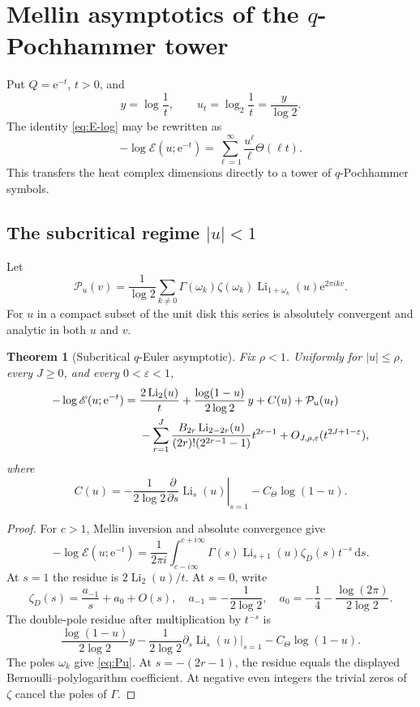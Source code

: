 \documentclass[11pt,oneside]{article}
\numberwithin{equation}{section}
\theoremstyle{plain}
\newtheorem{theorem}{Theorem}[section]
\theoremstyle{definition}
\theoremstyle{remark}
\newcommand{\Li}{\operatorname{Li}}
\newcommand{\dd}{\,\mathrm{d}}
\newcommand{\Ecal}{\mathscr E}
\newcommand{\Pcal}{\mathcal P}
\newcommand{\e}{\mathrm e}
\begin{document}
\section{Mellin asymptotics of the $q$-Pochhammer tower}

Put $Q=\e^{-t}$, $t>0$, and
\[
 y=\log\frac1t,
 \qquad
 u_t=\log_2\frac1t=\frac y{\log2}.
\]
The identity \cref{eq:E-log} may be rewritten as
\begin{equation}\label{eq:E-Theta}
 -\log\Ecal(u;\e^{-t})
 =\sum_{\ell=1}^{\infty}\frac{u^\ell}{\ell}\Theta(\ell t).
\end{equation}
This transfers the heat complex dimensions directly to a tower of $q$-Pochhammer symbols.

\subsection{The subcritical regime $|u|<1$}

Let
\begin{equation}\label{eq:Pu}
 \Pcal_u(v)=\frac1{\log2}
 \sum_{k\ne0}\Gamma(\omega_k)\zeta(\omega_k)
 \Li_{1+\omega_k}(u)\e^{2\pi ikv}.
\end{equation}
For $u$ in a compact subset of the unit disk this series is absolutely convergent and analytic in both $u$ and $v$.

\begin{theorem}[Subcritical $q$-Euler asymptotic]\label{thm:E-subcritical}
Fix $\rho<1$.  Uniformly for $|u|\le\rho$, every $J\ge0$, and every $0<\varepsilon<1$,
\begin{align}\label{eq:E-subcritical-asymp}
 -\log\Ecal(u;\e^{-t})
 ={}&\frac{2\Li_2(u)}t
 +\frac{\log(1-u)}{2\log2}\,y
 +C(u)+\Pcal_u(u_t)\\
 &-\sum_{r=1}^{J}
 \frac{B_{2r}\Li_{2-2r}(u)}{(2r)!(2^{2r-1}-1)}t^{2r-1}
 +O_{J,\rho,\varepsilon}(t^{2J+1-\varepsilon}),\notag
\end{align}
where
\begin{equation}\label{eq:Cu}
 C(u)=-\frac1{2\log2}
 \left.\frac{\partial}{\partial s}\Li_s(u)\right|_{s=1}
 -C_\Theta\log(1-u).
\end{equation}
\end{theorem}

\begin{proof}
For $c>1$, Mellin inversion and absolute convergence give
\begin{equation}\label{eq:E-Mellin}
 -\log\Ecal(u;\e^{-t})
 =\frac1{2\pi i}\int_{c-i\infty}^{c+i\infty}
 \Gamma(s)\Li_{s+1}(u)\zeta_D(s)t^{-s}\dd s.
\end{equation}
At $s=1$ the residue is $2\Li_2(u)/t$.  At $s=0$, write
\[
 \zeta_D(s)=\frac{a_{-1}}s+a_0+O(s),
 \quad
 a_{-1}=-\frac1{2\log2},
 \quad
 a_0=-\frac14-\frac{\log(2\pi)}{2\log2}.
\]
The double-pole residue after multiplication by $t^{-s}$ is
\[
 \frac{\log(1-u)}{2\log2}y
 -\frac1{2\log2}\left.\partial_s\Li_s(u)\right|_{s=1}
 -C_\Theta\log(1-u).
\]
The poles $\omega_k$ give \cref{eq:Pu}.  At $s=-(2r-1)$, the residue equals the displayed Bernoulli--polylogarithm coefficient.  At negative even integers the trivial zeros of $\zeta$ cancel the poles of $\Gamma$.
\end{proof}
\end{document}
